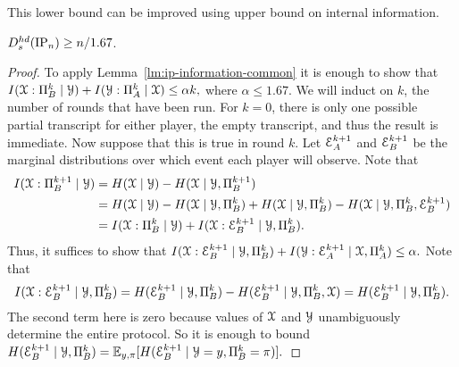 This lower bound can be improved using upper bound on internal information.

\begin{theorem}\label{thm:hds-ip-information}
$D^{hd}_s(\mathrm{IP}_n)\ge n/1.67$.
\end{theorem}
\begin{proof}
	To apply Lemma~\ref{lm:ip-information-common} it is enough to show that 
	$I(\mathcal{X}:\Pi_B^k\mid\mathcal{Y}) + I(\mathcal{Y}:\Pi_A^k\mid\mathcal{X})\leq \alpha k,$ where 	$\alpha\le 1.67$.
	We will induct on $k$, the number of rounds that have been run.
	For $k=0$, there is only one possible partial transcript for either player, the empty transcript, and thus the result is immediate.
	Now suppose that this is true in round $k$.
	Let $\mathcal{E}^{k+1}_A$ and $\mathcal{E}^{k+1}_B$ be the marginal distributions over which event each player will observe.
	Note that \begin{align*}
	I(\mathcal{X}:\Pi^{k+1}_B\mid\mathcal{Y})&=H(\mathcal{X}\mid\mathcal{Y})-H(\mathcal{X}\mid\mathcal{Y},\Pi^{k+1}_B)\\
	&=H(\mathcal{X}\mid\mathcal{Y})-H(\mathcal{X}\mid\mathcal{Y},\Pi^k_B)+H(\mathcal{X}\mid\mathcal{Y},\Pi^k_B)-H(\mathcal{X}\mid\mathcal{Y},\Pi^k_B,\mathcal{E}^{k+1}_B)\\
	&=I(\mathcal{X}:\Pi^k_B\mid\mathcal{Y})+I(\mathcal{X}:\mathcal{E}^{k+1}_B\mid\mathcal{Y},\Pi^k_B).
	\end{align*}
	Thus, it suffices to show that $I(\mathcal{X}:\mathcal{E}^{k+1}_B\mid\mathcal{Y},\Pi^k_B)+I(\mathcal{Y}:\mathcal{E}^{k+1}_A\mid\mathcal{X},\Pi^k_A)\leq \alpha.$ 
	Note that 
	\[
	I(\mathcal{X}:\mathcal{E}^{k+1}_B\mid\mathcal{Y},\Pi^k_B)
	= H(\mathcal{E}^{k+1}_B\mid\mathcal{Y},\Pi^k_B)-H(\mathcal{E}^{k+1}_B\mid\mathcal{Y},\Pi^k_B,\mathcal{X})
	= H(\mathcal{E}^{k+1}_B\mid\mathcal{Y},\Pi^k_B).
	\]
	The second term here is zero because values of $\mathcal{X}$ and $\mathcal{Y}$ unambiguously determine the entire protocol. 
	So it is enough to bound $H(\mathcal{E}^{k+1}_B\mid\mathcal{Y},\Pi^k_B) =\operatorname*{\mathbb{E}}_{y,\pi}[H(\mathcal{E}^{k+1}_B\mid\mathcal{Y}=y,\Pi^k_B=\pi)].$


\end{proof}
